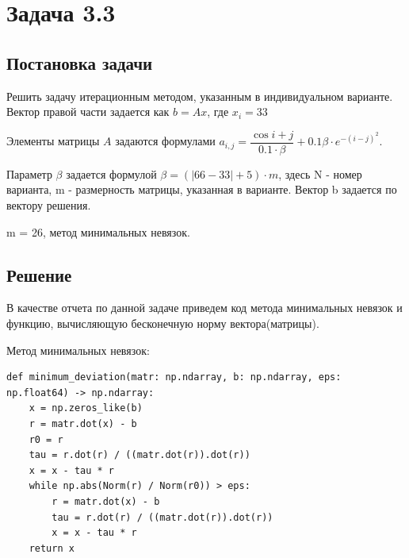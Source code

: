 \documentclass[a4paper,12pt]{report} %
\begin{document}
%
%
%

\section*{Задача 3.3}
\subsection*{Постановка задачи}

Решить задачу итерационным методом, указанным в индивидуальном варианте. Вектор правой части задается как $b = Ax$, где $x_i = 33$

Элементы матрицы $A$ задаются формулами \newline $a_{i, j} = \dfrac{\cos{i + j}}{0.1 \cdot \beta} + 0.1\beta \cdot e^{-(i - j)^2}$.

Параметр $\beta$ задается формулой $\beta = (|66 - 33| + 5) \cdot m$, здесь N - номер варианта, m - размерность матрицы, указанная в варианте. Вектор b задается по вектору решения.

m = 26, метод минимальных невязок.

\subsection*{Решение}
В качестве отчета по данной задаче приведем код метода минимальных невязок и функцию, вычисляющую бесконечную норму вектора(матрицы).

Метод минимальных невязок:

\begin{lstlisting}
def minimum_deviation(matr: np.ndarray, b: np.ndarray, eps: np.float64) -> np.ndarray:
    x = np.zeros_like(b)
    r = matr.dot(x) - b
    r0 = r
    tau = r.dot(r) / ((matr.dot(r)).dot(r))
    x = x - tau * r
    while np.abs(Norm(r) / Norm(r0)) > eps:
        r = matr.dot(x) - b
        tau = r.dot(r) / ((matr.dot(r)).dot(r))
        x = x - tau * r
    return x
\end{lstlisting}
\end{document}
